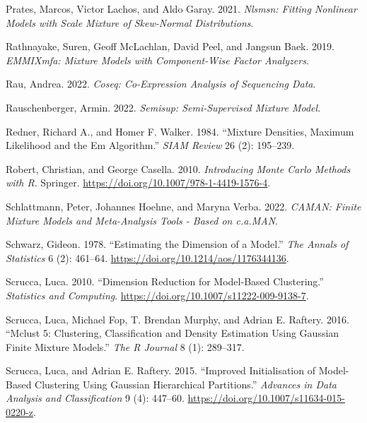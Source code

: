 \begin{CSLReferences}{1}{0}
\leavevmode{}%
Prates, Marcos, Victor Lachos, and Aldo Garay. 2021. \emph{Nlsmsn: Fitting Nonlinear Models with Scale Mixture of Skew-Normal Distributions}.

\leavevmode{}%
Rathnayake, Suren, Geoff McLachlan, David Peel, and Jangsun Baek. 2019. \emph{EMMIXmfa: Mixture Models with Component-Wise Factor Analyzers}.

\leavevmode{}%
Rau, Andrea. 2022. \emph{Coseq: Co-Expression Analysis of Sequencing Data}.

\leavevmode{}%
Rauschenberger, Armin. 2022. \emph{Semisup: Semi-Supervised Mixture Model}.

\leavevmode{}%
Redner, Richard A., and Homer F. Walker. 1984. {``Mixture {Densities}, {Maximum Likelihood} and the {Em Algorithm}.''} \emph{SIAM Review} 26 (2): 195--239.

\leavevmode{}%
Robert, Christian, and George Casella. 2010. \emph{Introducing {Monte Carlo Methods} with {R}}. {Springer}. \url{https://doi.org/10.1007/978-1-4419-1576-4}.

\leavevmode{}%
Schlattmann, Peter, Johannes Hoehne, and Maryna Verba. 2022. \emph{CAMAN: Finite Mixture Models and Meta-Analysis Tools - Based on c.a.MAN}.

\leavevmode{}%
Schwarz, Gideon. 1978. {``Estimating the {Dimension} of a {Model}.''} \emph{The Annals of Statistics} 6 (2): 461--64. \url{https://doi.org/10.1214/aos/1176344136}.

\leavevmode{}%
Scrucca, Luca. 2010. {``Dimension Reduction for Model-Based Clustering.''} \emph{Statistics and Computing}. \url{https://doi.org/10.1007/s11222-009-9138-7}.

\leavevmode{}%
Scrucca, Luca, Michael Fop, T. Brendan Murphy, and Adrian E. Raftery. 2016. {``Mclust 5: {Clustering}, {Classification} and {Density Estimation Using Gaussian Finite Mixture Models}.''} \emph{The R Journal} 8 (1): 289--317.

\leavevmode{}%
Scrucca, Luca, and Adrian E. Raftery. 2015. {``Improved Initialisation of Model-Based Clustering Using {Gaussian} Hierarchical Partitions.''} \emph{Advances in Data Analysis and Classification} 9 (4): 447--60. \url{https://doi.org/10.1007/s11634-015-0220-z}.


\end{CSLReferences}
